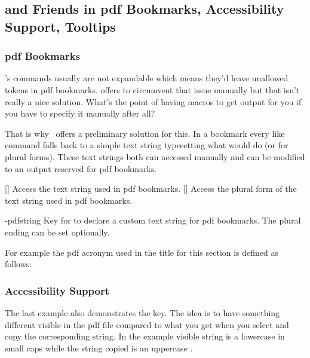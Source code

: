 \documentclass{acro-manual}
\begin{document}
\subsection{ and Friends in \acs*{pdf} Bookmarks, Accessibility
  Support, Tooltips}
\subsubsection{\acs*{pdf} Bookmarks}
\acro's commands usually are not expandable which means they'd leave unallowed
tokens in \acs{pdf} bookmarks.   offers  to
circumvent that issue manually but that isn't really a nice solution.  What's
the point of having macros to get output for you if you have to specify it
manually after all?

That is why \acro\ offers a preliminary solution for this.  In a bookmark
every  like command falls back to a simple text string typesetting what
 would do (or  for plural forms).  These text strings both
can accessed manually and can be modified to an output reserved for \acs{pdf}
bookmarks.

\begin{commands}
  []
    Access the text string used in \acs{pdf} bookmarks.
  []
    Access the plural form of the text string used in \acs{pdf} bookmarks.
\end{commands}
\begin{properties}
  \proplit-{pdfstring}{}
    Key for  to declare a custom text string for \acs{pdf}
    bookmarks.  The plural ending can be set optionally.
\end{properties}

For example the \acs{pdf} acronym used in the title for this section is defined
as follows:
\begin{sourcecode}
\end{sourcecode}

\subsubsection{Accessibility Support}

The last example also demonstrates the  key.  The idea is to
have something different visible in the \acs{pdf} file compared to what you
get when you select and copy the corresponding string.  In the example visible
string is a lowercase  in small caps while the string copied is an
uppercase .
\end{document}
